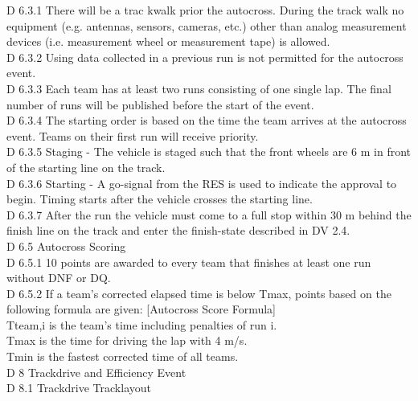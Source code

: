 \documentclass{article}
\begin{document}
D 6.3.1 There will be a trac kwalk prior the autocross. During the track walk no equipment (e.g. antennas, sensors, cameras, etc.) other than analog measurement devices (i.e. measurement wheel or measurement tape) is allowed.\\

D 6.3.2 Using data collected in a previous run is not permitted for the autocross event.\\

D 6.3.3 Each team has at least two runs consisting of one single lap. The final number of runs will be published before the start of the event.\\

D 6.3.4 The starting order is based on the time the team arrives at the autocross event. Teams on their first run will receive priority.\\

D 6.3.5 Staging - The vehicle is staged such that the front wheels are 6 m in front of the starting line on the track.\\

D 6.3.6 Starting - A go-signal from the RES is used to indicate the approval to begin. Timing starts after the vehicle crosses the starting line.\\

D 6.3.7 After the run the vehicle must come to a full stop within 30 m behind the finish line on the track and enter the finish-state described in DV 2.4.\\

D 6.5 Autocross Scoring\\

D 6.5.1 10 points are awarded to every team that finishes at least one run without DNF or DQ.\\

D 6.5.2 If a team's corrected elapsed time is below Tmax, points based on the following formula are given: [Autocross Score Formula]\\
	Tteam,i is the team's time including penalties of run i.\\
	Tmax is the time for driving the lap with 4 m/s.\\
	Tmin is the fastest corrected time of all teams.\\
	
D 8 Trackdrive and Efficiency Event\\

D 8.1 Trackdrive Tracklayout\\
\end{document}
